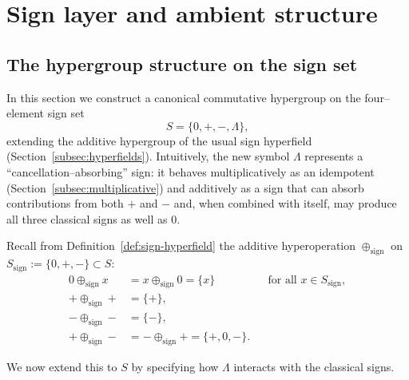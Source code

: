 \documentclass[11pt]{amsart}
\numberwithin{equation}{section}
\theoremstyle{definition}
\theoremstyle{remark}
\newcommand{\Sset}{S}                      %
\begin{document}

\section{Sign layer and ambient structure}
\label{sec:sign-envelope}

\subsection{The hypergroup structure on the sign set}
\label{subsec:sign-hypergroup}

In this section we construct a canonical commutative hypergroup on the
four--element sign set
\[
  \Sset = \{0,+,-,\Lambda\},
\]
extending the additive hypergroup of the usual sign hyperfield
(Section~\ref{subsec:hyperfields}).  Intuitively, the new symbol
$\Lambda$ represents a ``cancellation--absorbing'' sign: it behaves
multiplicatively as an idempotent (Section~\ref{subsec:multiplicative})
and additively as a sign that can absorb contributions from both $+$
and $-$ and, when combined with itself, may produce all three classical
signs as well as $0$.

\medskip

Recall from Definition~\ref{def:sign-hyperfield} the additive
hyperoperation $\oplus_{\mathrm{sign}}$ on
$S_{\mathrm{sign}}:=\{0,+,-\}\subset\Sset$:
\begin{align*}
  0\oplus_{\mathrm{sign}} x
  &= x\oplus_{\mathrm{sign}} 0
   = \{x\}
   &&\text{for all }x\in S_{\mathrm{sign}},\\
  +\oplus_{\mathrm{sign}} +
  &= \{+\},\\
  -\oplus_{\mathrm{sign}} -
  &= \{-\},\\
  +\oplus_{\mathrm{sign}} -
  &= -\oplus_{\mathrm{sign}} +
   = \{+,0,-\}.
\end{align*}

We now extend this to $\Sset$ by specifying how $\Lambda$ interacts
with the classical signs.
\end{document}
